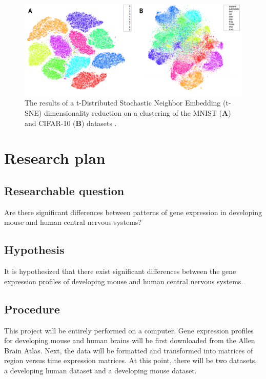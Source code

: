 \documentclass[12pt,oneside,onecolumn,a4paper]{article}
\begin{document}
\begin{figure}[H]
\begin{center}
\includegraphics[width=0.8\columnwidth]{figures/tsne}
\caption{The results of a t-Distributed Stochastic Neighbor Embedding (t-SNE) dimensionality reduction on a clustering of the MNIST (\textbf{A}) and CIFAR-10 (\textbf{B}) datasets \citep{laurensvandermaaten2014}. \label{fig:clusters}%
}
\end{center}
\end{figure}

\section{Research plan}


\subsection{Researchable question}
Are there significant differences between patterns of gene expression in developing mouse and human central nervous systems?

\subsection{Hypothesis}

It is hypothesized that there exist significant differences between the gene expression profiles of developing mouse and human central nervous systems.

\subsection{Procedure}
This project will be entirely performed on a computer. Gene expression profiles for developing mouse and human brains will be first downloaded from the Allen Brain Atlas. Next, the data will be formatted and transformed into matrices of region versus time expression matrices. At this point, there will be two datasets, a developing human dataset and a developing mouse dataset. 
\end{document}

